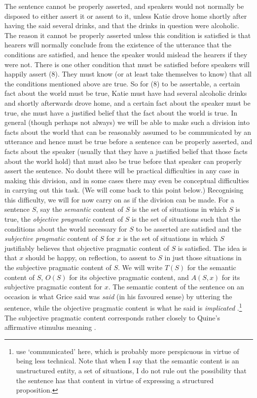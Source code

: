 The sentence cannot be properly asserted, and speakers would not normally be disposed to either assert it or assent to it, unless Katie drove home shortly after having the said several drinks, and that the drinks in question were alcoholic. The reason it cannot be properly asserted unless this condition is satisfied is that hearers will normally conclude from the existence of the utterance that the conditions are satisfied, and hence the speaker would mislead the hearers if they were not. There is one other condition that must be satisfied before speakers will happily assert (8). They must know (or at least take themselves to know) that all the conditions mentioned above are true. So for (8) to be assertable, a certain fact about the world must be true, Katie must have had several alcoholic drinks and shortly afterwards drove home, and a certain fact about the speaker must be true, she must have a justified belief that the fact about the world is true. In general (though perhaps not always) we will be able to make such a division into facts about the world that can be reasonably assumed to be communicated by an utterance and hence must be true before a sentence can be properly asserted, and facts about the speaker (usually that they have a justified belief that those facts about the world hold) that must also be true before that speaker can properly assert the sentence. No doubt there will be practical difficulties in any case in making this division, and in some cases there may even be conceptual difficulties in carrying out this task. (We will come back to this point below.) Recognising this difficulty, we will for now carry on as if the division can be made. For a sentence \(S\), say the \textit{semantic }content of \(S\) is the set of situations in which \(S\) is true, the \textit{objective pragmatic }content of \(S\) is the set of situations such that the conditions about the world necessary for \(S\) to be asserted are satisfied and the\textit{ subjective pragmatic }content of \(S\) for \(x\) is the set of situations in which \(S\) justifiably believes that objective pragmatic content of \(S\) is satisfied. The idea is that \(x\) should be happy, on reflection, to assent to \(S\) in just those situations in the subjective pragmatic content of \(S\). We will write \(T(S)\) for the semantic content of \(S\), \(O(S)\) for its objective pragmatic content, and \(A(S, x)\) for its subjective pragmatic content for \(x\). The semantic content of the sentence on an occasion is what Grice said was \textit{said} (in his favoured sense) by uttering the sentence, while the objective pragmatic content is what he said is \textit{implicated} \citep[118]{Grice1989}.\footnote{\cite[230]{Stanley2000-STAOQD} use `communicated' here, which is probably more perspicuous in virtue of being less technical. Note that when I say that the semantic content is an unstructured entity, a set of situations, I do not rule out the possibility that the sentence has that content in virtue of expressing a structured proposition. } The subjective pragmatic content corresponds rather closely to Quine's affirmative stimulus meaning \cite[33]{Quine1960}.

